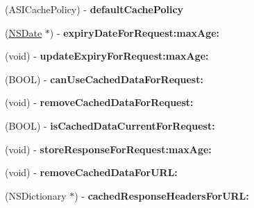 \begin{DoxyCompactItemize}
\item 
\hypertarget{protocol_a_s_i_cache_delegate-p_a1207aea079945294e7bb48c621d82a67}{
(\-A\-S\-I\-Cache\-Policy) -\/ {\bfseries default\-Cache\-Policy}}
\label{protocol_a_s_i_cache_delegate-p_a1207aea079945294e7bb48c621d82a67}

\item 
\hypertarget{protocol_a_s_i_cache_delegate-p_a36d0b83c9017dba94a93acc3cae9aa65}{
(\hyperlink{class_n_s_date}{\-N\-S\-Date} $\ast$) -\/ {\bfseries expiry\-Date\-For\-Request\-:max\-Age\-:}}
\label{protocol_a_s_i_cache_delegate-p_a36d0b83c9017dba94a93acc3cae9aa65}

\item 
\hypertarget{protocol_a_s_i_cache_delegate-p_ad793f424847f6f7a2c5154fb8cec1bb6}{
(void) -\/ {\bfseries update\-Expiry\-For\-Request\-:max\-Age\-:}}
\label{protocol_a_s_i_cache_delegate-p_ad793f424847f6f7a2c5154fb8cec1bb6}

\item 
\hypertarget{protocol_a_s_i_cache_delegate-p_a7cf0deb09983a6b552fd7a2130529c95}{
(\-B\-O\-O\-L) -\/ {\bfseries can\-Use\-Cached\-Data\-For\-Request\-:}}
\label{protocol_a_s_i_cache_delegate-p_a7cf0deb09983a6b552fd7a2130529c95}

\item 
\hypertarget{protocol_a_s_i_cache_delegate-p_a2e34141ed1db825ca2d1c292b068193e}{
(void) -\/ {\bfseries remove\-Cached\-Data\-For\-Request\-:}}
\label{protocol_a_s_i_cache_delegate-p_a2e34141ed1db825ca2d1c292b068193e}

\item 
\hypertarget{protocol_a_s_i_cache_delegate-p_a67c31b3473af7adba4cd548045935ac2}{
(\-B\-O\-O\-L) -\/ {\bfseries is\-Cached\-Data\-Current\-For\-Request\-:}}
\label{protocol_a_s_i_cache_delegate-p_a67c31b3473af7adba4cd548045935ac2}

\item 
\hypertarget{protocol_a_s_i_cache_delegate-p_ae7cfacf47d3d24e151530c033f993734}{
(void) -\/ {\bfseries store\-Response\-For\-Request\-:max\-Age\-:}}
\label{protocol_a_s_i_cache_delegate-p_ae7cfacf47d3d24e151530c033f993734}

\item 
\hypertarget{protocol_a_s_i_cache_delegate-p_aa2d162430d8c9bc47057030b3e305f18}{
(void) -\/ {\bfseries remove\-Cached\-Data\-For\-U\-R\-L\-:}}
\label{protocol_a_s_i_cache_delegate-p_aa2d162430d8c9bc47057030b3e305f18}

\item 
\hypertarget{protocol_a_s_i_cache_delegate-p_ab7b267fc153dcf624c91e2d07513f868}{
(\-N\-S\-Dictionary $\ast$) -\/ {\bfseries cached\-Response\-Headers\-For\-U\-R\-L\-:}}
\label{protocol_a_s_i_cache_delegate-p_ab7b267fc153dcf624c91e2d07513f868}


\end{DoxyCompactItemize}
